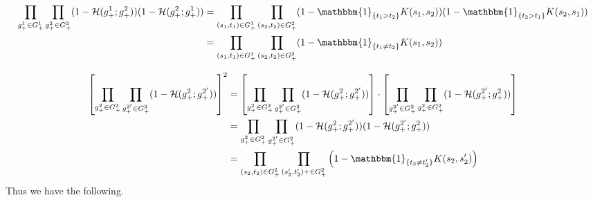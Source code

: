 \documentclass[12pt]{article}
\begin{document}
\begin{align*}
\prod_{g^1_+ \in G^1_+} \prod_{g^2_+ \in G^2_+} ( 1- \mH (g_+^1 ; g^2_+) )( 1- \mH (g_+^2 ; g^1_+) ) &= \prod_{(s_1, t_1) \in G^1_+} \prod_{(s_2, t_2) \in G^2_+} (1 - \mathbbm{1}_{\{ t_1 > t_2\}} K(s_1, s_2)) (1 - \mathbbm{1}_{\{ t_2 > t_1\}} K(s_2, s_1))  \\
&= \prod_{(s_1, t_1) \in G^1_+} \prod_{(s_2, t_2) \in G^2_+} (1 - \mathbbm{1}_{\{ t_1 \neq t_2\}} K(s_1, s_2))
\end{align*}

\begin{align*}
\left[ \prod_{g^2_+ \in G^2_+} \prod_{g^{2'}_+ \in G^2_+} ( 1- \mH (g_+^2 ; g^{2'}_+) ) \right]^2 &= \left[ \prod_{g^2_+ \in G^2_+} \prod_{g^{2'}_+ \in G^2_+} ( 1- \mH (g_+^2 ; g^{2'}_+) ) \right] \cdot 
\left[ \prod_{g^{2'}_+ \in G^2_+} \prod_{g^2_+ \in G^2_+} ( 1- \mH ( g^{2'}_+ ; g_+^2) ) \right] \\
&= \prod_{g^2_+ \in G^2_+} \prod_{g^{2'}_+ \in G^2_+} ( 1- \mH (g_+^2 ; g^{2'}_+) ) ( 1- \mH ( g^{2'}_+ ; g_+^2) ) \\
&= \prod_{(s_2, t_2) \in G^2_+} \prod_{(s'_2, t'_2)+ \in G^2_+} \left( 1- \mathbbm{1}_{\{ t_2 \neq t'_2 \}} K(s_2, s'_2) \right)
\end{align*}
Thus we have the following.
\end{document}
